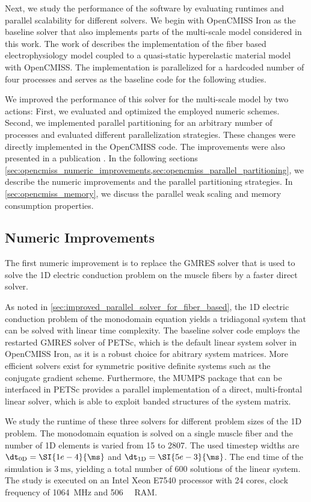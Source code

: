 Next, we study the performance of the software by evaluating runtimes and parallel scalability for different solvers.
We begin with OpenCMISS Iron as the baseline solver that also implements parts of the multi-scale model considered in this work. The work of \cite{Heidlauf2013} describes the implementation of the fiber based electrophysiology model coupled to a quasi-static hyperelastic material model with OpenCMISS. The implementation is parallelized for a hardcoded number of four processes and serves as the baseline code for the following studies.

We improved the performance of this solver for the multi-scale model by two actions: First, we evaluated and optimized the employed numeric schemes. Second, we implemented parallel partitioning for an arbitrary number of processes and evaluated different parallelization strategies.
These changes were directly implemented in the OpenCMISS code. The improvements were also presented in a publication \cite{Bradley:2018:EDB}. In the following sections \cref{sec:opencmiss_numeric_improvements,sec:opencmiss_parallel_partitioning}, we describe the numeric improvements and the parallel partitioning strategies. In \cref{sec:opencmiss_memory}, we discuss the parallel weak scaling and memory consumption properties.

\subsection{Numeric Improvements}\label{sec:opencmiss_numeric_improvements}

The first numeric improvement is to replace the GMRES solver that is used to solve the 1D electric conduction problem on the muscle fibers
by a faster direct solver. 

As noted in \cref{sec:improved_parallel_solver_for_fiber_based}, the 1D electric conduction problem of the monodomain equation yields a tridiagonal system that can be solved with linear time complexity. The baseline solver code employs the restarted GMRES solver of PETSc, which is the default linear system solver in OpenCMISS Iron, as it is a robust choice for abitrary system matrices. 
More efficient solvers exist for symmetric positive definite systems such as the conjugate gradient scheme. 
Furthermore, the MUMPS package \cite{mumps2001} that can be interfaced in PETSc provides a parallel implementation of a direct, multi-frontal linear solver, which is able to exploit banded structures of the system matrix.

We study the runtime of these three solvers for different problem sizes of the 1D problem. The monodomain equation is solved on a single muscle fiber and the number of 1D elements is varied from 15 to 2807. The used timestep widths are $\dt_\text{0D}=\SI{1e-4}{\ms}$ and $\dt_\text{1D}=\SI{5e-3}{\ms}$. The end time of the simulation is $\SI{3}{\ms}$, yielding a total number of 600 solutions of the linear system. The study is executed on an Intel Xeon E7540 processor with 24 cores, clock frequency of \SI{1064}{\mega\hertz} and \SI{506}{\gibi\byte} RAM.

